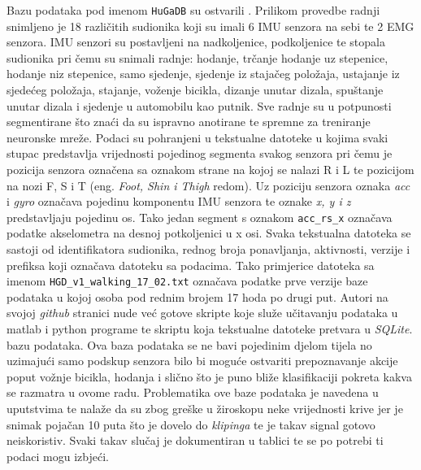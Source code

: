 \documentclass[times, utf8, diplomski]{fer}
\begin{document}
Bazu podataka pod imenom \texttt{HuGaDB} su ostvarili \cite{HuGaDB}. Prilikom provedbe radnji snimljeno je 18 različitih sudionika
koji su imali 6 IMU senzora na sebi te 2 EMG senzora. IMU senzori su postavljeni na nadkoljenice, podkoljenice te stopala sudionika
pri čemu su snimali radnje: hodanje, trčanje hodanje uz stepenice, hodanje niz stepenice, samo sjedenje, sjedenje iz stajačeg položaja,
ustajanje iz sjedećeg položaja, stajanje, voženje bicikla, dizanje unutar dizala, spuštanje unutar dizala i sjedenje
u automobilu kao putnik. Sve radnje su u potpunosti segmentirane što znaći da su ispravno anotirane te spremne za treniranje
neuronske mreže. Podaci su pohranjeni u tekstualne datoteke u kojima svaki stupac predstavlja vrijednosti pojedinog segmenta
svakog senzora pri čemu je pozicija senzora označena sa oznakom strane na kojoj se nalazi R i L te pozicijom na nozi F, S i T
(eng. \textit{Foot, Shin i Thigh} redom). Uz poziciju senzora oznaka \textit{acc} i \textit{gyro} označava pojedinu komponentu
IMU senzora te oznake \textit{x, y i z} predstavljaju pojedinu os. Tako jedan segment s oznakom \texttt{acc\_rs\_x} označava
podatke akselometra na desnoj potkoljenici u x osi. Svaka tekstualna datoteka se sastoji od identifikatora sudionika,
rednog broja ponavljanja, aktivnosti, verzije i prefiksa koji označava datoteku sa podacima. Tako primjerice datoteka sa imenom
\texttt{HGD\_v1\_walking\_17\_02.txt} označava podatke prve verzije baze podataka u kojoj osoba pod rednim brojem 17 hoda po
drugi put. Autori \cite{HuGaDB} na svojoj \textit{github} stranici nude već gotove skripte koje služe učitavanju podataka u
matlab i python programe te skriptu koja tekstualne datoteke pretvara u \textit{SQLite}. bazu podataka.
Ova baza podataka se ne bavi pojedinim djelom tijela no uzimajući samo podskup 
senzora bilo bi moguće ostvariti prepoznavanje akcije poput vožnje bicikla, hodanja i slično što je puno bliže klasifikaciji pokreta
kakva se razmatra u ovome radu. Problematika ove baze podataka je navedena u uputstvima te nalaže da su zbog greške u žiroskopu
neke vrijednosti krive jer je snimak pojačan 10 puta što je dovelo do \textit{klipinga} te je takav signal gotovo neiskoristiv.
Svaki takav slučaj je dokumentiran u tablici te se po potrebi ti podaci mogu izbjeći.
\end{document}
